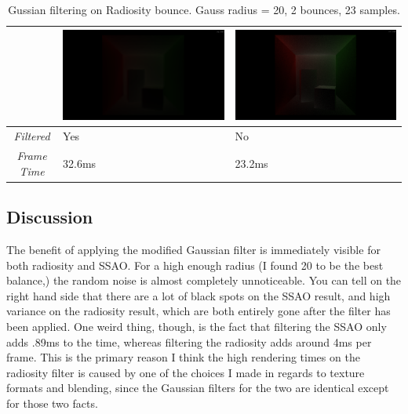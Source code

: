 \begin{table}[!ht]
\begin{center}
\begin{tabular}{| c | p{5cm} | p{5cm} |}
\hline
&
\includegraphics[scale=0.15,trim=0 0 0 -5]{img//results/radiosity/wBlend} &
\includegraphics[scale=0.15,trim=0 0 0 -5]{img/results/radiosity/woBlend} \\
\hline
\emph{Filtered} & Yes & No \\
\hline
\emph{Frame Time} & 32.6ms & 23.2ms \\
\hline
\end{tabular}
\caption{Gussian filtering on Radiosity bounce. Gauss radius = 20, 2 bounces, 23 samples.}
\label{table-gauss-rad}
\end{center}
\end{table}

\subsection{Discussion}
The benefit of applying the modified Gaussian filter is immediately visible for both radiosity and SSAO. For a high enough radius (I found 20 to be the best balance,) the random noise is almost completely unnoticeable. You can tell on the right hand side that there are a lot of black spots on the SSAO result, and high variance on the radiosity result, which are both entirely gone after the filter has been applied. One weird thing, though, is the fact that filtering the SSAO only adds .89ms to the time, whereas filtering the radiosity adds around 4ms per frame. This is the primary reason I think the high rendering times on the radiosity filter is caused by one of the choices I made in regards to texture formats and blending, since the Gaussian filters for the two are identical except for those two facts.

